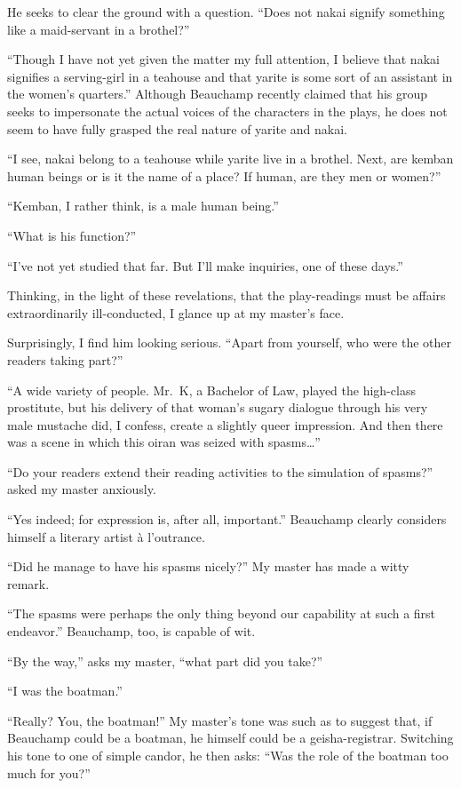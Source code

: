 \documentclass{book}
\begin{document}
He seeks to clear the ground with a question. ``Does not nakai signify
something like a maid-servant in a brothel?''

``Though I have not yet given the matter my full attention, I believe
that nakai signifies a serving-girl in a teahouse and that yarite is
some sort of an assistant in the women's quarters.'' Although Beauchamp
recently claimed that his group seeks to impersonate the actual voices
of the characters in the plays, he does not seem to have fully grasped
the real nature of yarite and nakai.

``I see, nakai belong to a teahouse while yarite live in a brothel.
Next, are kemban human beings or is it the name of a place? If human,
are they men or women?''

``Kemban, I rather think, is a male human being.''

``What is his function?''

``I've not yet studied that far. But I'll make inquiries, one of these
days.''

Thinking, in the light of these revelations, that the play-readings must
be affairs extraordinarily ill-conducted, I glance up at my master's
face.

Surprisingly, I find him looking serious. ``Apart from yourself, who
were the other readers taking part?''

``A wide variety of people. Mr.~K, a Bachelor of Law, played the
high-class prostitute, but his delivery of that woman's sugary dialogue
through his very male mustache did, I confess, create a slightly queer
impression. And then there was a scene in which this oiran was seized
with spasms\ldots{}''

``Do your readers extend their reading activities to the simulation of
spasms?'' asked my master anxiously.

``Yes indeed; for expression is, after all, important.'' Beauchamp
clearly considers himself a literary artist à l'outrance.

``Did he manage to have his spasms nicely?'' My master has made a witty
remark.

``The spasms were perhaps the only thing beyond our capability at such a
first endeavor.'' Beauchamp, too, is capable of wit.

``By the way,'' asks my master, ``what part did you take?''

``I was the boatman.''

``Really? You, the boatman!'' My master's tone was such as to suggest
that, if Beauchamp could be a boatman, he himself could be a
geisha-registrar. Switching his tone to one of simple candor, he then
asks: ``Was the role of the boatman too much for you?''
\end{document}

